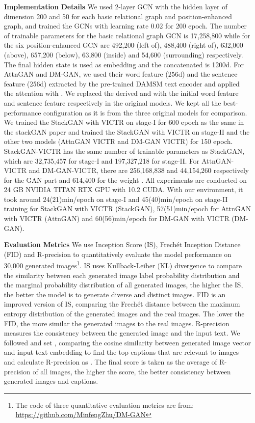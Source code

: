 \documentclass[11pt]{article}
\begin{document}
\noindent \textbf{Implementation Details} We used 2-layer GCN with the hidden layer of dimension 200 and 50 for each basic relational graph and position-enhanced graph, and trained the GCNs with learning rate 0.02 for 200 epoch. The number of trainable parameters for the basic relational graph GCN is 17,258,800 while for the six position-enhanced GCN are 492,200 (left of), 488,400 (right of), 632,000 (above), 657,200 (below), 63,800 (inside) and 54,600 (surrounding) respectively. The final hidden state is used as embedding and the concatenated  is 1200d. For AttnGAN and DM-GAN, we used their word feature  (256d) and the sentence feature  (256d) extracted by the pre-trained DAMSM text encoder and applied the attention with . We replaced the derived  and  with the initial word feature  and sentence feature  respectively in the original models. We kept all the best-performance configuration as it is from the three original models for comparison. We trained the StackGAN with VICTR on stage-I for 600 epoch as the same in the stackGAN paper and trained the StackGAN with VICTR on stage-II and the other two models (AttnGAN VICTR and DM-GAN VICTR) for 150 epoch. StackGAN-VICTR has the same number of trainable parameters as StackGAN, which are 32,735,457 for stage-I and 197,327,218 for stage-II. For AttnGAN-VICTR and DM-GAN-VICTR, there are 256,168,838 and 44,154,260 respectively for the GAN part and 614,400 for the weight . All experiments are conducted on 24 GB NVIDIA TITAN RTX GPU with 10.2 CUDA. With our environment, it took around 24(21)min/epoch on stage-I and 45(40)min/epoch on stage-II training for StackGAN with VICTR (StackGAN), 57(51)min/epoch for AttnGAN with VICTR (AttnGAN) and 60(56)min/epoch for DM-GAN with VICTR (DM-GAN).



\noindent \textbf{Evaluation Metrics} We use Inception Score (IS), Frech\'et Inception Distance (FID) and R-precision to quantitatively evaluate the model performance on 30,000 generated images\footnote{The code of three quantitative evaluation metrics are from: \url{https://github.com/MinfengZhu/DM-GAN}}. IS \cite{salimans2016improved} uses Kullback-Leiber (KL) divergence to compare the similarity between each generated image label probability distribution and the marginal probability distribution of all generated images, the higher the IS, the better the model is to generate diverse and distinct images. FID \cite{heusel2017gans} is an improved version of IS, comparing the Frech\'et distance between the maximum entropy distribution of the generated images and the real images. The lower the FID, the more similar the generated images to the real images. R-precision measures the consistency between the generated image and the input text. We followed  and set , comparing the cosine similarity between generated image vector and input text embedding to find the top  captions that are relevant to images and calculate R-precision as . The final score is taken as the average of R-precision of all images, the higher the score, the better consistency between generated images and captions.
\end{document}
